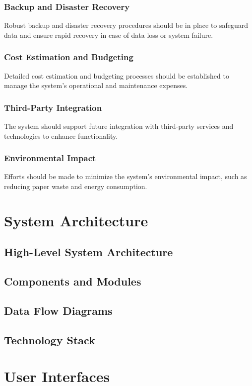 \documentclass{article}
\begin{document}
\subsubsection{Backup and Disaster Recovery}
Robust backup and disaster recovery procedures should be in place to safeguard data and ensure rapid recovery in case of data loss or system failure.

\subsubsection{Cost Estimation and Budgeting}
Detailed cost estimation and budgeting processes should be established to manage the system's operational and maintenance expenses.

\subsubsection{Third-Party Integration}
The system should support future integration with third-party services and technologies to enhance functionality.

\subsubsection{Environmental Impact}
Efforts should be made to minimize the system's environmental impact, such as reducing paper waste and energy consumption.

\section{System Architecture}
   \subsection{High-Level System Architecture}
   \subsection{Components and Modules}
   \subsection{Data Flow Diagrams}
   \subsection{Technology Stack}

\section{User Interfaces}
\end{document}
